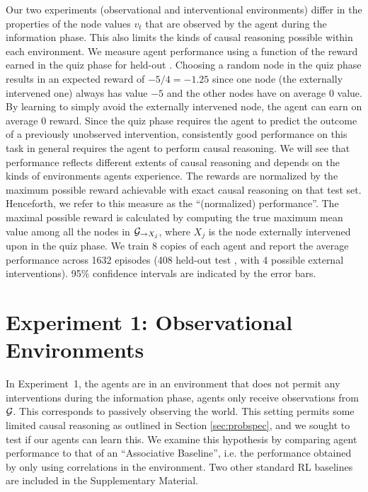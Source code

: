 Our two experiments (observational and interventional environments) differ in the properties of the node values $v_t$ that are observed by the agent during the information phase. This also limits the kinds of causal reasoning possible within each environment. We measure agent performance using a function of the reward earned in the quiz phase for held-out \CBNs. 
Choosing a random node in the quiz phase results in an expected reward of $-5 / 4 = -1.25$ since one node (the externally intervened one) always has value $-5$ and the other nodes have on average $0$ value. By learning to simply avoid the externally intervened node, the agent can earn on average $0$ reward. Since the quiz phase requires the agent to predict the outcome of a previously unobserved intervention, consistently good performance on this task in general requires the agent to perform causal reasoning. We will see that performance reflects different extents of causal reasoning and depends on the kinds of environments agents experience. The rewards are normalized by the maximum possible reward achievable with exact causal reasoning on that test set. Henceforth, we refer to this measure as the ``(normalized) performance''. The maximal possible reward is calculated by computing the true maximum mean value among all the nodes in ${\cal G}_{\rightarrow X_j}$, where $X_j$ is the node externally intervened upon in the quiz phase. %
We train 8 copies of each agent and report the average performance across 1632 episodes (408 held-out test \CBNs, with 4 possible external interventions). 95$\%$ confidence intervals are indicated by the error bars. 

\section{Experiment 1: Observational Environments}
\label{sec:expt1}

In Experiment~1, the agents are in an environment that does not permit any interventions during the information phase, agents only receive observations from ${\cal G}$.
This corresponds to passively observing the world. This setting permits some limited causal reasoning as outlined in Section \ref{sec:probspec}, and we sought to test if our agents can learn this. We examine this hypothesis by comparing agent performance to that of an ``Associative Baseline'', i.e. the performance obtained by only using correlations in the environment. Two other standard RL baselines are included in the Supplementary Material.

